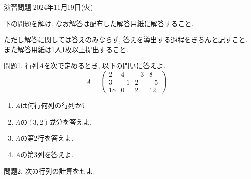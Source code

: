 \documentclass[dvipdfmx,a4paper,11pt]{article}
\theoremstyle{definition}
\begin{document}
\pagestyle{empty}



\begin{center}
{\Large 演習問題 2024年11月19日(火)} \\

\end{center}


\begin{center}
 {\large 下の問題を解け. なお解答は配布した解答用紙に解答すること.}
  \end{center}
 ただし解答に関しては答えのみならず, 答えを導出する過程をきちんと記すこと. 
 また解答用紙は1人1枚以上提出すること.
  
  \vspace{11pt}
 
 
 問題1.  行列$A$を次で定めるとき, 以下の問いに答えよ.
 $$
 A = 
 \begin{pmatrix}
 2 &4&-3&8 \\
 3&-1&2&-5 \\
  18&0&2&12
 \end{pmatrix}
 $$
 \begin{enumerate}
   \setlength{\parskip}{0cm} %
  \setlength{\itemsep}{0cm} %
 \item $A$は何行何列の行列か?
 \item $A$の$(3,2)$成分を答えよ.
  \item $A$の第2行を答えよ.
 \item $A$の第3列を答えよ.
 \end{enumerate}
 
\vspace{5pt}
 問題2. 次の行列の計算をせよ.
\end{document}
